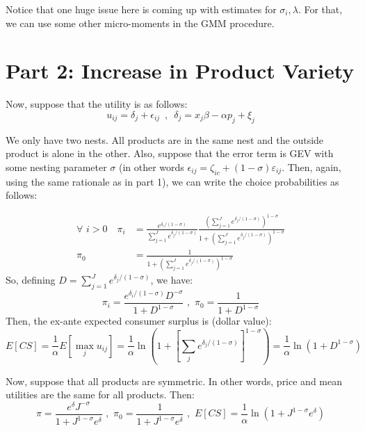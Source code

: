 \documentclass[12pt]{article}
\begin{document}
Notice that one huge issue here is coming up with estimates for $\sigma_i, \lambda$. For that, we can use some other micro-moments in the GMM procedure. 

\setcounter{equation}{0}
\section*{Part 2: Increase in Product Variety}

Now, suppose that the utility is as follows:
\begin{equation}
    u_{ij} = \delta_j + \epsilon_{ij} \,\,\,,\,\,\,
    \delta_j = x_j \beta - \alpha p_j + \xi_j
\end{equation}

We only have two nests. All products are in the same nest and the outside product is alone in the other. Also, suppose that the error term is GEV with some nesting parameter $\sigma$ (in other words $\epsilon_{ij} = \zeta_{ic} + (1-\sigma) \varepsilon_{ij}$. Then, again, using the same rationale as in part 1), we can write the choice probabilities as follows:

\begin{align}
    \forall \,\, i > 0\,\,\,\,\,\, \pi_{i} &= \frac{e^{\delta_i/(1-\sigma)}}{\sum_{j=1}^J e^{\delta_j/(1-\sigma)}} \frac{\left(\sum_{j=1}^J e^{\delta_j/(1-\sigma)}\right)^{1-\sigma}}{1 + \left(\sum_{j=1}^J e^{\delta_j/(1-\sigma)}\right)^{1-\sigma}} \\
    \pi_0 &= \frac{1}{1 + \left(\sum_{j=1}^J e^{\delta_j/(1-\sigma)}\right)^{1-\sigma}}
\end{align}
So, defining $D = \sum_{j=1}^J e^{\delta_j/(1-\sigma)}$, we have:
\begin{equation}
    \pi_i = \frac{e^{\delta_i/(1-\sigma)} D^{-\sigma}}{1+D^{1-\sigma}}\,\, ,\,\, \pi_0 = \frac{1}{1+D^{1-\sigma}} 
\end{equation}
Then, the ex-ante expected consumer surplus is (dollar value):
\begin{equation}
    E[CS] = \frac{1}{\alpha} E[\max_{j} u_{ij}] = \frac{1}{\alpha} \ln \left(1 + \left[\sum_j e^{\delta_j/(1-\sigma)}\right]^{1-\sigma}\right) = \frac{1}{\alpha} \ln \left(1+D^{1-\sigma}\right)
\end{equation}

Now, suppose that all products are symmetric. In other words, price and mean utilities are the same for all products. Then:
\begin{equation}
    \pi = \frac{e^{\delta} J^{-\sigma}}{1+J^{1-\sigma}e^\delta} \,\, ,\,\, \pi_0 = \frac{1}{1+J^{1-\sigma}e^\delta} \,\, ,\,\, E[CS] = \frac{1}{\alpha} \ln \left(1+J^{1-\sigma}e^\delta\right) 
\end{equation}
\end{document}
